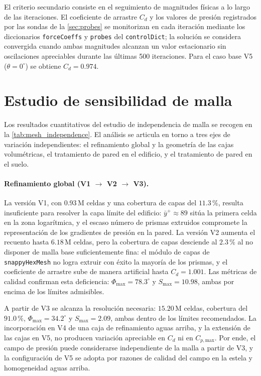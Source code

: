 El criterio secundario consiste en el seguimiento de magnitudes físicas a lo largo de las iteraciones. El coeficiente de arrastre $C_d$ y los valores de presión registrados por las sondas de la \autoref{sec:probes} se monitorizan en cada iteración mediante los diccionarios \texttt{forceCoeffs} y \texttt{probes} del \texttt{controlDict}; la solución se considera convergida cuando ambas magnitudes alcanzan un valor estacionario sin oscilaciones apreciables durante las últimas 500 iteraciones. Para el caso base V5 ($\theta = 0^\circ$) se obtiene $C_d = 0.974$.

\section{Estudio de sensibilidad de malla}
\label{sec:mesh_sensitivity}

Los resultados cuantitativos del estudio de independencia de malla se recogen en la \autoref{tab:mesh_independence}. El análisis se articula en torno a tres ejes de variación independientes: el refinamiento global y la geometría de las cajas volumétricas, el tratamiento de pared en el edificio, y el tratamiento de pared en el suelo.

\paragraph{Refinamiento global (V1 $\to$ V2 $\to$ V3).}
La versión V1, con $0.93\,\mathrm{M}$ celdas y una cobertura de capas del $11.3\,\%$, resulta insuficiente para resolver la capa límite del edificio: $\bar{y}^+ \approx 89$ sitúa la primera celda en la zona logarítmica, y el escaso número de prismas extruidos compromete la representación de los gradientes de presión en la pared. La versión V2 aumenta el recuento hasta $6.18\,\mathrm{M}$ celdas, pero la cobertura de capas desciende al $2.3\,\%$ al no disponer de malla base suficientemente fina: el módulo de capas de \texttt{snappyHexMesh} no logra extruir con éxito la mayoría de los prismas, y el coeficiente de arrastre sube de manera artificial hasta $C_d = 1.001$. Las métricas de calidad confirman esta deficiencia: $\varPhi_\mathrm{max} = 78.3^\circ$ y $S_\mathrm{max} = 10.98$, ambas por encima de los límites admisibles.

A partir de V3 se alcanza la resolución necesaria: $15.20\,\mathrm{M}$ celdas, cobertura del $91.0\,\%$, $\varPhi_\mathrm{max} = 34.2^\circ$ y $S_\mathrm{max} = 2.09$, ambas dentro de los límites recomendados. La incorporación en V4 de una caja de refinamiento aguas arriba, y la extensión de las cajas en V5, no producen variación apreciable en $C_d$ ni en $C_{p,\mathrm{max}}$. Por ende, el campo de presión puede considerarse independiente de la malla a partir de V3, y la configuración de V5 se adopta por razones de calidad del campo en la estela y homogeneidad aguas arriba.

